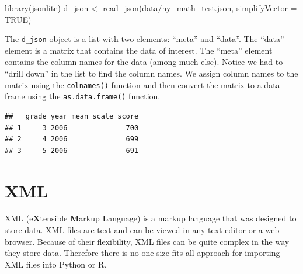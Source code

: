 \documentclass[
]{book}
\newenvironment{Shaded}{\begin{snugshade}}{\end{snugshade}}
\newcommand{\AttributeTok}[1]{\textcolor[rgb]{0.77,0.63,0.00}{#1}}
\newcommand{\ConstantTok}[1]{\textcolor[rgb]{0.00,0.00,0.00}{#1}}
\newcommand{\DecValTok}[1]{\textcolor[rgb]{0.00,0.00,0.81}{#1}}
\newcommand{\FunctionTok}[1]{\textcolor[rgb]{0.00,0.00,0.00}{#1}}
\newcommand{\NormalTok}[1]{#1}
\newcommand{\OtherTok}[1]{\textcolor[rgb]{0.56,0.35,0.01}{#1}}
\newcommand{\SpecialCharTok}[1]{\textcolor[rgb]{0.00,0.00,0.00}{#1}}
\newcommand{\StringTok}[1]{\textcolor[rgb]{0.31,0.60,0.02}{#1}}
\begin{document}
\begin{Shaded}
\begin{Highlighting}[]
\FunctionTok{library}\NormalTok{(jsonlite)}
\NormalTok{d\_json }\OtherTok{\textless{}{-}} \FunctionTok{read\_json}\NormalTok{(}\StringTok{\textquotesingle{}data/ny\_math\_test.json\textquotesingle{}}\NormalTok{, }\AttributeTok{simplifyVector =} \ConstantTok{TRUE}\NormalTok{)}
\end{Highlighting}
\end{Shaded}

The \texttt{d\_json} object is a list with two elements: ``meta'' and ``data''. The ``data'' element is a matrix that contains the data of interest. The ``meta'' element contains the column names for the data (among much else). Notice we had to ``drill down'' in the list to find the column names. We assign column names to the matrix using the \texttt{colnames()} function and then convert the matrix to a data frame using the \texttt{as.data.frame()} function.

\begin{Shaded}
\end{Shaded}

\begin{verbatim}
##   grade year mean_scale_score
## 1     3 2006              700
## 2     4 2006              699
## 3     5 2006              691
\end{verbatim}

\hypertarget{xml}{%
\section{XML}\label{xml}}

XML (e\textbf{X}tensible \textbf{M}arkup \textbf{L}anguage) is a markup language that was designed to store data. XML files are text and can be viewed in any text editor or a web browser. Because of their flexibility, XML files can be quite complex in the way they store data. Therefore there is no one-size-fits-all approach for importing XML files into Python or R.
\end{document}
